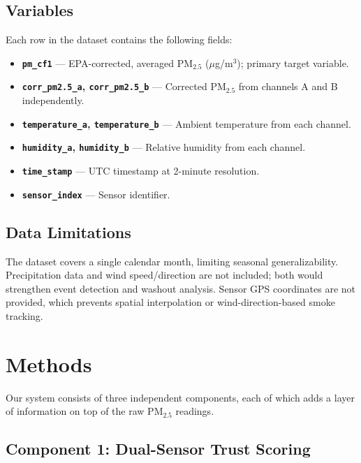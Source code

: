 \documentclass[11pt, letterpaper]{article}
\begin{document}
\subsection{Variables}

Each row in the dataset contains the following fields:

\begin{itemize}[noitemsep]
  \item \textbf{\texttt{pm\_cf1}} --- EPA-corrected, averaged PM$_{2.5}$ ($\mu$g/m$^3$);
        primary target variable.
  \item \textbf{\texttt{corr\_pm2.5\_a}, \texttt{corr\_pm2.5\_b}} --- Corrected PM$_{2.5}$
        from channels A and B independently.
  \item \textbf{\texttt{temperature\_a}, \texttt{temperature\_b}} --- Ambient temperature
        from each channel.
  \item \textbf{\texttt{humidity\_a}, \texttt{humidity\_b}} --- Relative humidity from
        each channel.
  \item \textbf{\texttt{time\_stamp}} --- UTC timestamp at 2-minute resolution.
  \item \textbf{\texttt{sensor\_index}} --- Sensor identifier.
\end{itemize}

\subsection{Data Limitations}

The dataset covers a single calendar month, limiting seasonal generalizability.
Precipitation data and wind speed/direction are not included; both would
strengthen event detection and washout analysis.
Sensor GPS coordinates are not provided, which prevents spatial interpolation
or wind-direction-based smoke tracking.

\section{Methods}

Our system consists of three independent components, each of which adds a layer
of information on top of the raw PM$_{2.5}$ readings.

\subsection{Component 1: Dual-Sensor Trust Scoring}
\end{document}
